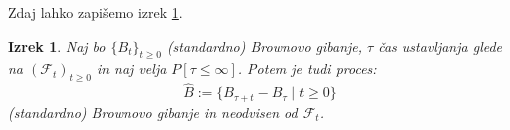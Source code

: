 \documentclass[11pt]{article}
\newtheorem{izrek}{Izrek}
\newcommand{\f}{\mathcal{F}}
\begin{document}
    Zdaj lahko zapišemo izrek \ref{thm:stopped_brownian}. %
    
    \begin{izrek}
    \label{thm:stopped_brownian}
    Naj bo \(\{B_t\}_{t \geq 0}\) (standardno) Brownovo gibanje, \(\tau\) čas ustavljanja glede na
    \((\f_t)_{t \geq 0}\) in naj velja \(P{[\tau \le \infty]}\).
    Potem je tudi proces:
    \[
    \hat{B} := \{B_{\tau+t} - B_\tau \mid t \geq 0\}
    \]
    (standardno) Brownovo gibanje in neodvisen od $\f_t$.
    \end{izrek}

    

    

    \printindex
    
\end{document}
